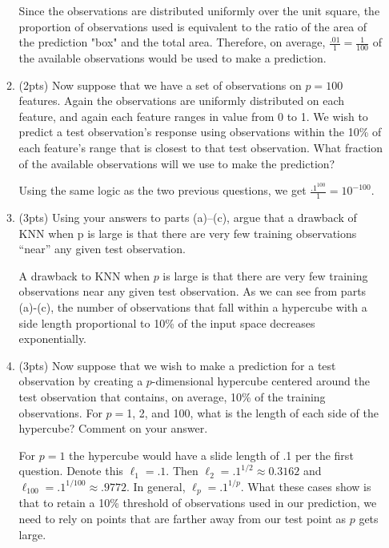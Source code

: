 \documentclass[a4paper]{article}
\theoremstyle{definition}
\newenvironment{soln}{
    \leavevmode\color{blue}\ignorespaces
}{}
\begin{document}
\begin{enumerate}
\begin{enumerate}
	\begin{soln}
		Since the observations are distributed uniformly over the unit square, the proportion of observations used is equivalent to the ratio of the area of the prediction "box" and the total area.
		Therefore, on average, $\frac{.01}{1} = \frac{1}{100}$ of the available observations would be used to make a prediction.
	\end{soln}
	
	\item (2pts) Now suppose that we have a set of observations on $p = 100$ features. Again the observations are uniformly distributed on each feature, and again each feature ranges in value from 0 to 1. We wish to predict a test observation’s response using observations within the 10\% of each feature’s range that is closest to that test observation. What fraction of the available observations will we use to make the prediction?
	
	\begin{soln}
		Using the same logic as the two previous questions, we get $\frac{.1^{100}}{1} = 10^{-100}$.
	\end{soln}
	
	\item (3pts) Using your answers to parts (a)–(c), argue that a drawback of KNN when p is large is that there are very few training observations “near” any given test observation.
	
	\begin{soln}
		A drawback to KNN when $p$ is large is that there are very few training observations near any given test observation.
		As we can see from parts (a)-(c), the number of observations that fall within a hypercube with a side length proportional to 10\% of the input space decreases exponentially.
	\end{soln}
	
	\item (3pts) Now suppose that we wish to make a prediction for a test observation by creating a $p$-dimensional hypercube centered around the test observation that contains, on average, 10\% of the training observations. For $p =$1, 2, and 100, what is the length of each side of the hypercube? Comment on your answer.
	
	\begin{soln}
		For $p = 1$ the hypercube would have a slide length of .1 per the first question.
		Denote this $\ell_{1} = .1$.
		Then $\ell_{2} = .1^{1/2} \approx 0.3162$ and $\ell_{100} = .1^{1/100} \approx .9772$.
		In general, $\ell_{p} = .1^{1/p}$.
		What these cases show is that to retain a 10\% threshold of observations used in our prediction, we need to rely on points that are farther away from our test point as $p$ gets large.
	\end{soln}
	

\end{enumerate}
\end{enumerate}
\end{document}
